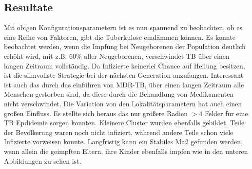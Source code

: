 \documentclass[paper=a4, fontsize=11pt, ngerman, abstract=on]{scrartcl}
\numberwithin{equation}{section} %
\numberwithin{figure}{section} %
\numberwithin{table}{section} %
\begin{document}
\subsection{Resultate}

Mit obigen Konfigurationsparametern ist es nun spannend zu beobachten, ob es eine Reihe von Faktoren, gibt die Tuberkulose eindämmen können. Es konnte beobachtet werden, wenn die Impfung bei Neugeborenen der Population deutlich erhöht wird, mit z.B. 60\% aller Neugeborenen, verschwindet TB über einen langen Zeitraum vollständig. Da Infizierte keinerlei Chance auf Heilung besitzen, ist die sinnvollste Strategie bei der nächsten Generation anzufangen. Interessant ist auch das durch das einführen von MDR-TB, über einen langen Zeitraum alle Menschen gestorben sind, da diese durch die Behandlung von Medikamenten nicht verschwindet. Die Variation von den Lokalitätsparametern hat auch einen großen Einfluss. Es stellte sich heraus das nur größere Radien $> 4$ Felder für eine TB Epdidemie sorgen konnten. Kleinere Cluster wurden ebenfalls gebildet. Teile der Bevölkerung waren noch nicht infiziert, während andere Teile schon viele Infizierte vorweisen konnte. Langfristig kann ein Stabiles Maß gefunden werden, wenn allein die geimpften Eltern, ihre Kinder ebenfalls impfen wie in den unteren Abbildungen zu sehen ist.
\end{document}
